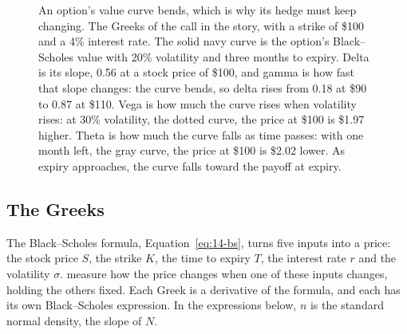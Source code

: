 \begin{figure}[htbp]
\caption{An option's value curve bends, which is why its hedge must keep changing. The Greeks of the call in the story, with a strike of \$100 and a 4\% interest rate. The solid navy curve is the option's Black--Scholes value with 20\% volatility and three months to expiry. Delta is its slope, 0.56 at a stock price of \$100, and gamma is how fast that slope changes: the curve bends, so delta rises from 0.18 at \$90 to 0.87 at \$110. Vega is how much the curve rises when volatility rises: at 30\% volatility, the dotted curve, the price at \$100 is \$1.97 higher. Theta is how much the curve falls as time passes: with one month left, the gray curve, the price at \$100 is \$2.02 lower. As expiry approaches, the curve falls toward the payoff at expiry.}
\label{fig:14-bs}
\end{figure}

\subsection{The Greeks}
\label{sec:14-greeks}

The Black--Scholes formula, Equation~\eqref{eq:14-bs}, turns five inputs into a price: the stock price $S$, the strike $K$, the time to expiry $T$, the interest rate $r$ and the volatility $\sigma$.  measure how the price changes when one of these inputs changes, holding the others fixed. Each Greek is a derivative of the formula, and each has its own Black--Scholes expression. In the expressions below, $n$ is the standard normal density, the slope of $N$.

